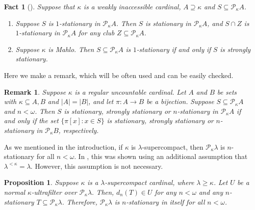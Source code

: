 \documentclass[a4paper,12pt,reqno,oneside]{amsart}
\theoremstyle{plain}
\newtheorem{prop}[theorem]{Proposition}
\newtheorem{fact}[theorem]{Fact}
\newtheorem{rmk}[theorem]{Remark}
\newcommand{\mcal}{\mathcal}
\begin{document}
\begin{fact}[\cite{CLHZ, T}] \label{fact:1-stat}
Suppose that $\kappa$ is a weakly inaccessible cardinal, $A \supseteq \kappa$ and $S \subseteq \mcal{P}_\kappa A$.
\begin{enumerate}
\item Suppose $S$ is $1$-stationary in $\mcal{P}_\kappa A$. Then $S$ is stationary in $\mcal{P}_\kappa A$, and $S \cap Z$ is $1$-stationary in $\mcal{P}_\kappa A$ for any club $Z \subseteq \mcal{P}_\kappa A$.
\item Suppose $\kappa$ is Mahlo. Then $S \subseteq \mcal{P}_{\kappa}{A}$ is $1$-stationary if and only if $S$ is strongly stationary.
\end{enumerate}
\end{fact}



Here we make a remark, which will be often used and can be easily checked.


\begin{rmk} \label{rmk:base_set}
Suppose $\kappa$ is a regular uncountable cardinal. Let $A$ and $B$ be sets with $\kappa \subseteq A , B$ and $|A| = |B|$, and let $\pi : A \to B$ be a bijection. Suppose $S \subseteq \mcal{P}_\kappa A$ and $n < \omega$. Then $S$ is stationary, strongly stationary or $n$-stationary in $\mcal{P}_\kappa A$ if and only if the set $\{ \pi [x] : x \in S \}$ is stationary, strongly stationary or $n$-stationary in $\mcal{P}_\kappa B$, respectively.
\end{rmk}


As we mentioned in the introduction, if $\kappa$ is $\lambda$-supercompact, then $\mcal{P}_\kappa \lambda$ is $n$-stationary for all $n < \omega$. In \cite{CLHZ, T}, this was shown using an additional assumption that $\lambda^{< \kappa} = \lambda$. However, this assumption is not necessary.


\begin{prop} \label{prop:spcmpct_n_stat}Suppose $\kappa$ is a $\lambda$-supercompact cardinal, where $\lambda \geq \kappa$. Let $U$ be a normal $\kappa$-ultrafilter over $\mcal{P}_\kappa \lambda$. Then, $d_n (T) \in U$ for any $n < \omega$ and any $n$-stationary $T \subseteq \mcal{P}_\kappa \lambda$. Therefore, $\mcal{P}_\kappa \lambda$ is $n$-stationary in itself for all $n < \omega$.
\end{prop}
\end{document}
